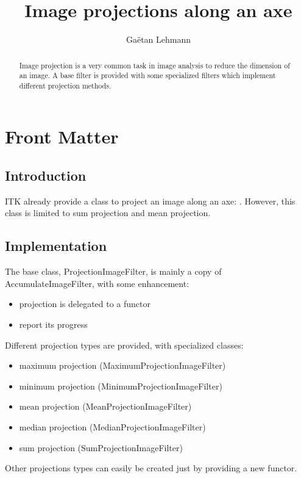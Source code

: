 \documentclass{InsightArticle}
\title{Image projections along an axe}
\author{Ga\"etan Lehmann}
\begin{document}
\maketitle

\ifhtml
\chapter*{Front Matter\label{front}}
\fi


\begin{abstract}
\noindent
Image projection is a very common task in image analysis to reduce the dimension
of an image. A base filter is provided with some specialized filters which
implement different projection methods.
\end{abstract}


\section{Introduction}
ITK already provide a class to project an image along an axe:
. However, this class is limited to sum
projection and mean projection.


\section{Implementation}

The base class, ProjectionImageFilter, is mainly a copy of
AccumulateImageFilter, with some enhancement:
\begin{itemize}
  \item projection is delegated to a functor
  \item report its progress
\end{itemize}
Different projection types are provided, with specialized classes:
\begin{itemize}
  \item maximum projection (MaximumProjectionImageFilter)
  \item minimum projection (MinimumProjectionImageFilter)
  \item mean projection (MeanProjectionImageFilter)
  \item median projection (MedianProjectionImageFilter)
  \item sum projection (SumProjectionImageFilter)
\end{itemize}
Other projections types can easily be created just by providing a new functor.
\end{document}

